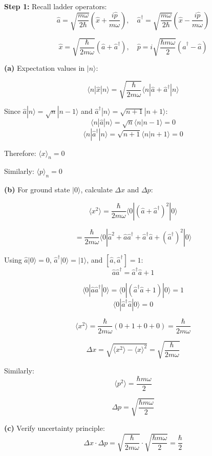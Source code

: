 \documentclass[12pt,a4paper]{article}
\begin{document}
\begin{solution}
\textbf{Step 1:} Recall ladder operators:
$$\hat{a} = \sqrt{\frac{m\omega}{2\hbar}}\left(\hat{x} + \frac{i\hat{p}}{m\omega}\right), \quad \hat{a}^\dagger = \sqrt{\frac{m\omega}{2\hbar}}\left(\hat{x} - \frac{i\hat{p}}{m\omega}\right)$$

$$\hat{x} = \sqrt{\frac{\hbar}{2m\omega}}(\hat{a} + \hat{a}^\dagger), \quad \hat{p} = i\sqrt{\frac{\hbar m\omega}{2}}(\hat{a}^\dagger - \hat{a})$$

\textbf{(a)} Expectation values in $|n\rangle$:

$$\langle n|\hat{x}|n\rangle = \sqrt{\frac{\hbar}{2m\omega}}\langle n|\hat{a} + \hat{a}^\dagger|n\rangle$$

Since $\hat{a}|n\rangle = \sqrt{n}|n-1\rangle$ and $\hat{a}^\dagger|n\rangle = \sqrt{n+1}|n+1\rangle$:
$$\langle n|\hat{a}|n\rangle = \sqrt{n}\langle n|n-1\rangle = 0$$
$$\langle n|\hat{a}^\dagger|n\rangle = \sqrt{n+1}\langle n|n+1\rangle = 0$$

Therefore: $\langle x \rangle_n = 0$

Similarly: $\langle p \rangle_n = 0$

\textbf{(b)} For ground state $|0\rangle$, calculate $\Delta x$ and $\Delta p$:

$$\langle x^2 \rangle = \frac{\hbar}{2m\omega}\langle 0|(\hat{a} + \hat{a}^\dagger)^2|0\rangle$$

$$= \frac{\hbar}{2m\omega}\langle 0|\hat{a}^2 + \hat{a}\hat{a}^\dagger + \hat{a}^\dagger\hat{a} + (\hat{a}^\dagger)^2|0\rangle$$

Using $\hat{a}|0\rangle = 0$, $\hat{a}^\dagger|0\rangle = |1\rangle$, and $[\hat{a}, \hat{a}^\dagger] = 1$:
$$\hat{a}\hat{a}^\dagger = \hat{a}^\dagger\hat{a} + 1$$

$$\langle 0|\hat{a}\hat{a}^\dagger|0\rangle = \langle 0|(\hat{a}^\dagger\hat{a} + 1)|0\rangle = 1$$
$$\langle 0|\hat{a}^\dagger\hat{a}|0\rangle = 0$$

$$\langle x^2 \rangle = \frac{\hbar}{2m\omega}(0 + 1 + 0 + 0) = \frac{\hbar}{2m\omega}$$

$$\Delta x = \sqrt{\langle x^2 \rangle - \langle x \rangle^2} = \sqrt{\frac{\hbar}{2m\omega}}$$

Similarly:
$$\langle p^2 \rangle = \frac{\hbar m\omega}{2}$$

$$\Delta p = \sqrt{\frac{\hbar m\omega}{2}}$$

\textbf{(c)} Verify uncertainty principle:
$$\Delta x \cdot \Delta p = \sqrt{\frac{\hbar}{2m\omega}} \cdot \sqrt{\frac{\hbar m\omega}{2}} = \frac{\hbar}{2}$$


\end{solution}
\end{document}
